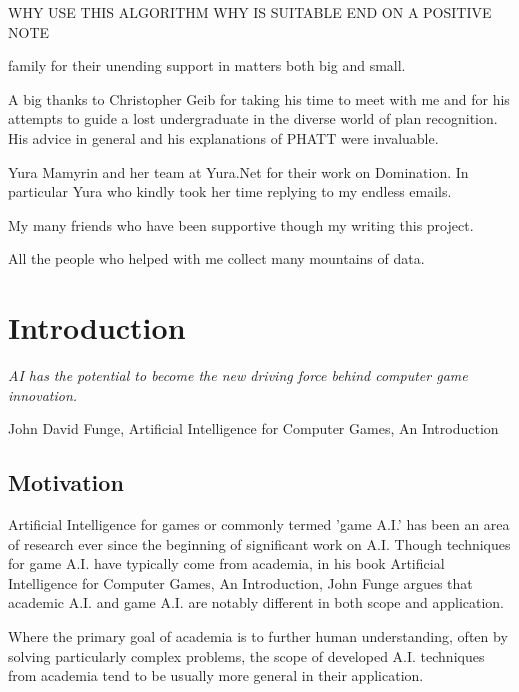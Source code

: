 \documentclass[parskip]{cs4rep}
\begin{document}
WHY USE THIS ALGORITHM WHY IS SUITABLE END ON A POSITIVE NOTE

family for their unending support in matters both big and small. 

A big thanks to Christopher Geib for taking his time to meet with me and for his attempts to guide a lost undergraduate in the diverse world of plan recognition. His advice in general and his explanations of PHATT were invaluable. 

Yura Mamyrin and her team at Yura.Net for their work on Domination. In particular Yura who kindly took her time replying to my endless emails.

My many friends who have been supportive though my writing this project. 

All the people who helped with me collect many mountains of data.

\tableofcontents


\chapter{Introduction}

\begin{flushleft}
\textit{AI has the potential to become the new driving force behind computer game innovation.}
\end{flushleft}
\begin{flushleft}
John David Funge, Artificial Intelligence for Computer Games, An Introduction
\end{flushleft}

\section{Motivation}

Artificial Intelligence for games or commonly termed 'game A.I.' has been an area of research ever since the beginning of significant work on A.I. Though techniques for game A.I. have typically come from academia, in his book Artificial Intelligence for Computer Games, An Introduction, John Funge argues \cite{JohnFunge:AIForComp} that academic A.I. and game A.I. are notably different in both scope and application.

Where the primary goal of academia is to further human understanding, often by solving particularly complex problems, the scope of developed A.I. techniques from academia tend to be usually more general in their application.
\end{document}

